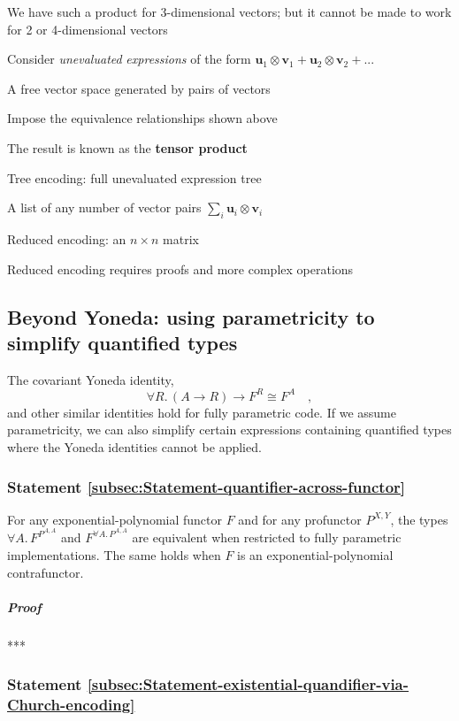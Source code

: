 We have such a product for 3-dimensional vectors; but it cannot be
made to work for 2 or 4-dimensional vectors

Consider \emph{unevaluated} \emph{expressions} of the form $\mathbf{u}_{1}\otimes\mathbf{v}_{1}+\mathbf{u}_{2}\otimes\mathbf{v}_{2}+...$

A free vector space generated by pairs of vectors

Impose the equivalence relationships shown above

The result is known as the \textbf{tensor product}

Tree encoding: full unevaluated expression tree

A list of any number of vector pairs $\sum_{i}\mathbf{u}_{i}\otimes\mathbf{v}_{i}$

Reduced encoding: an $n\times n$ matrix

Reduced encoding requires proofs and more complex operations

\subsection{Beyond Yoneda: using parametricity to simplify quantified types}

The covariant Yoneda identity,
\[
\forall R.\,(A\rightarrow R)\rightarrow F^{R}\cong F^{A}\quad,
\]
and other similar identities hold for fully parametric code. If we
assume parametricity, we can also simplify certain expressions containing
quantified types where the Yoneda identities cannot be applied.

\subsubsection{Statement \label{subsec:Statement-quantifier-across-functor}\ref{subsec:Statement-quantifier-across-functor}}

For any exponential-polynomial functor $F$ and for any profunctor
$P^{X,Y}$, the types $\forall A.\,F^{P^{A,A}}$ and $F^{\forall A.\,P^{A,A}}$
are equivalent when restricted to fully parametric implementations.
The same holds when $F$ is an exponential-polynomial contrafunctor.

\subparagraph{Proof}

{*}{*}{*}

\subsubsection{Statement \label{subsec:Statement-existential-quandifier-via-Church-encoding}\ref{subsec:Statement-existential-quandifier-via-Church-encoding}}

